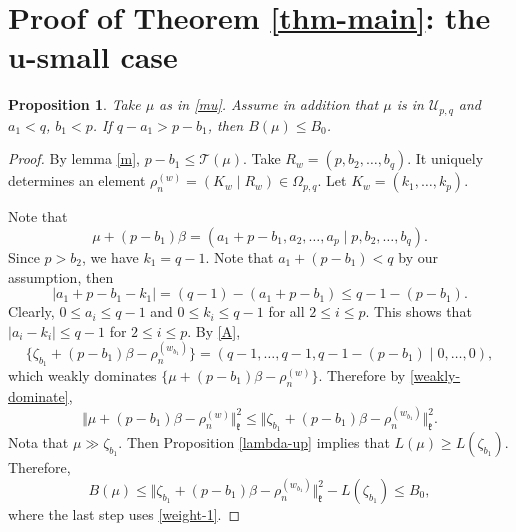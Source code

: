 \documentclass[11pt]{amsart}
\theoremstyle{plain}
\newtheorem{prop}[thm]{Proposition}
\theoremstyle{definition}
\newcommand{\frk}{\mathfrak{k}}
\newcommand{\caT}{\mathcal{T}}
\newcommand{\caU}{\mathcal{U}}
\begin{document}
\section{Proof of Theorem \ref{thm-main}: the u-small case}\label{sec-u-small}
\begin{prop}
	Take $\mu$ as in \eqref{mu}. Assume in addition that $\mu$ is in $\caU_{p,q}$ and $a_1<q$, $b_1<p$. If $q-a_1>p-b_1$, then $B(\mu)\le B_0$.
\end{prop}
\begin{proof}
	 By lemma \ref{m},  $p-b_1\le\caT(\mu)$. Take $R_w=(p,b_2,\dots,b_q)$. It uniquely determines an element $\rho_n^{(w)}=(K_w\mid R_w)\in \Omega_{p, q}$. Let $K_w=(k_1, \dots, k_p)$.
	
Note that
	\[\mu+(p-b_1)\beta=(a_1+p-b_1, a_2, \dots, a_p \mid p, b_2, \dots, b_q).\]
	Since $p>b_2$, we have $k_1=q-1$. Note that $a_1+(p-b_1)<q$ by our assumption, then
	\[|a_1+p-b_1-k_1|=(q-1)-(a_1+p-b_1)\le q-1-(p-b_1).\]
	Clearly, $0\le a_i\le q-1$ and $0\le k_i\le q-1$ for all $2\le i\le p$. This shows that $|a_i-k_i|\le q-1$ for $2\le i\le p$. By \eqref{A},
	\[\{\zeta_{b_1}+(p-b_1)\beta-\rho_n^{(w_{b_1})}\}=(q-1, \dots, q-1, q-1-(p-b_1)\mid 0, \dots, 0),\]
which weakly dominates $\{\mu+(p-b_1)\beta-\rho_n^{(w)}\}$. Therefore  by \eqref{weakly-dominate},	\[\Vert\mu+(p-b_1)\beta-\rho_n^{(w)}\Vert_\frk^2\le\Vert\zeta_{b_1}+(p-b_1)\beta-\rho_n^{(w_{b_1})}\Vert_\frk^2.\]
	Nota that $\mu\gg\zeta_{b_1}$. Then Proposition \ref{lambda-up} implies that $L(\mu)\ge L(\zeta_{b_1})$. Therefore,
	\[B(\mu)\le \Vert\zeta_{b_1}+(p-b_1)\beta-\rho_n^{(w_{b_1})}\Vert_\frk^2-L(\zeta_{b_1})\le B_0,\]
where the last step uses \eqref{weight-1}.
\end{proof}
\end{document}
